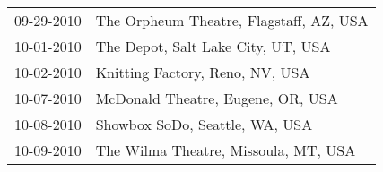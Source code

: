 \begin{supertabular}{ll}
 09-29-2010 &  The Orpheum Theatre, Flagstaff, AZ, USA \\
 10-01-2010 &       The Depot, Salt Lake City, UT, USA \\
 10-02-2010 &          Knitting Factory, Reno, NV, USA \\
 10-07-2010 &        McDonald Theatre, Eugene, OR, USA \\
 10-08-2010 &           Showbox SoDo, Seattle, WA, USA \\
 10-09-2010 &     The Wilma Theatre, Missoula, MT, USA \\
\end{supertabular}
